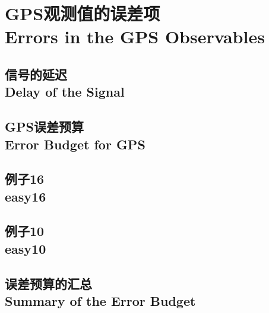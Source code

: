 \section[GPS观测值的误差项]{GPS观测值的误差项\\Errors in the GPS Observables}

	\subsection[信号的延迟]{信号的延迟\\Delay of the Signal}
	
	\subsection[GPS误差预算]{GPS误差预算\\Error Budget for GPS}
	
	\subsection[例子16]{例子16\\easy16}\label{subsec:easy16}
	
	\subsection[例子10]{例子10\\easy10}\label{subsec:easy10}
	
	\subsection[误差预算的汇总]{误差预算的汇总\\Summary of the Error Budget}
	

